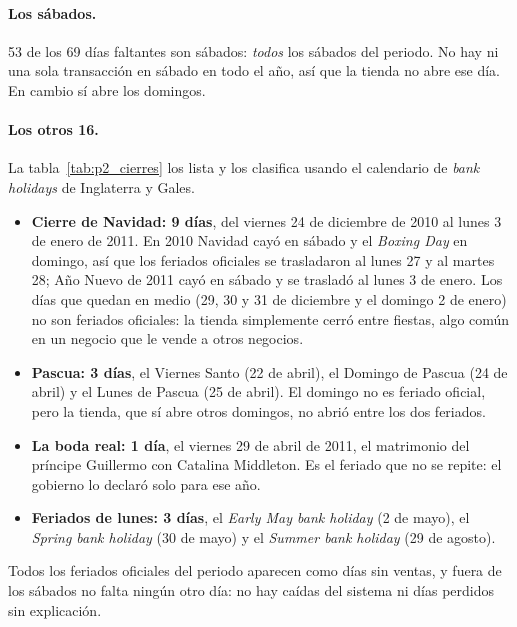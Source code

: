 \paragraph{Los sábados.} 53 de los 69 días faltantes son sábados: \emph{todos}
los sábados del periodo. No hay ni una sola transacción en sábado en todo el
año, así que la tienda no abre ese día. En cambio sí abre los domingos.

\paragraph{Los otros 16.} La tabla~\ref{tab:p2_cierres} los lista y los
clasifica usando el calendario de \emph{bank holidays} de Inglaterra y Gales.

\begin{table}[H]
  \centering
  \small
  \caption{Días entre semana (sin contar sábados) sin ninguna transacción.}
  \label{tab:p2_cierres}
\end{table}

\begin{itemize}
  \item \textbf{Cierre de Navidad: 9 días}, del viernes 24 de diciembre de
    2010 al lunes 3 de enero de 2011. En 2010 Navidad cayó en sábado y el
    \emph{Boxing Day} en domingo, así que los feriados oficiales se
    trasladaron al lunes 27 y al martes 28; Año Nuevo de 2011 cayó en sábado
    y se trasladó al lunes 3 de enero. Los días que quedan en medio (29, 30 y
    31 de diciembre y el domingo 2 de enero) no son feriados oficiales: la
    tienda simplemente cerró entre fiestas, algo común en un negocio que le
    vende a otros negocios.
  \item \textbf{Pascua: 3 días}, el Viernes Santo (22 de abril), el Domingo de
    Pascua (24 de abril) y el Lunes de Pascua (25 de abril). El domingo no es
    feriado oficial, pero la tienda, que sí abre otros domingos, no abrió
    entre los dos feriados.
  \item \textbf{La boda real: 1 día}, el viernes 29 de abril de 2011, el
    matrimonio del príncipe Guillermo con Catalina Middleton. Es el feriado
    que no se repite: el gobierno lo declaró solo para ese año.
  \item \textbf{Feriados de lunes: 3 días}, el \emph{Early May bank
    holiday} (2 de mayo), el \emph{Spring bank holiday} (30 de mayo) y el
    \emph{Summer bank holiday} (29 de agosto).
\end{itemize}

Todos los feriados oficiales del periodo aparecen como días sin ventas, y
fuera de los sábados no falta ningún otro día: no hay caídas del sistema ni
días perdidos sin explicación.


